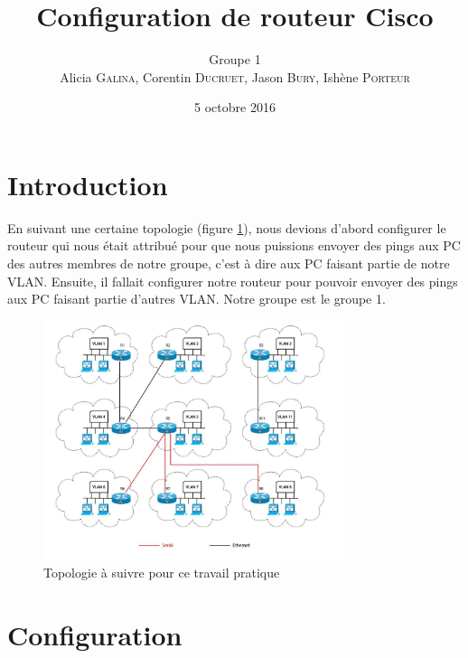 \documentclass[a4paper,11pt]{article}
\title{Configuration de routeur Cisco}
\author{Groupe 1\\Alicia \textsc{Galina}, Corentin \textsc{Ducruet}, Jason \textsc{Bury}, Ishène \textsc{Porteur}}
\date{5 octobre 2016}
\begin{document}
\maketitle

\section{Introduction}
En suivant une certaine topologie (figure \ref{fig:topo}),
nous devions d'abord configurer le routeur qui nous était attribué pour que nous puissions envoyer des pings aux PC des autres membres de notre groupe,
c'est à dire aux PC faisant partie de notre VLAN.
Ensuite, il fallait configurer notre routeur pour pouvoir envoyer des pings aux PC faisant partie d'autres VLAN.
Notre groupe est le groupe 1.
\begin{figure}
 \centering
 \includegraphics[height=7cm]{topo.jpg}
 \caption{Topologie à suivre pour ce travail pratique}
 \label{fig:topo}
\end{figure}

\section{Configuration}
\end{document}
